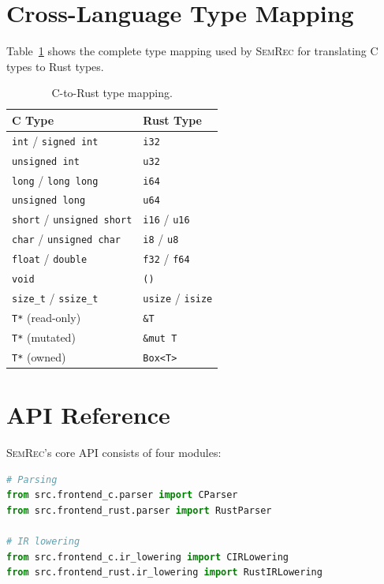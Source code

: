 \documentclass[11pt,a4paper]{article}
\begin{document}
\begin{appendices}
\section{Cross-Language Type Mapping}\label{app:typemap}

Table~\ref{tab:typemap} shows the complete type mapping used by
\textsc{SemRec} for translating C types to Rust types.

\begin{table}[h]
\centering
\small
\caption{C-to-Rust type mapping.}
\label{tab:typemap}
\begin{tabular}{@{}ll@{}}
\toprule
C Type & Rust Type \\
\midrule
\texttt{int} / \texttt{signed int} & \texttt{i32} \\
\texttt{unsigned int} & \texttt{u32} \\
\texttt{long} / \texttt{long long} & \texttt{i64} \\
\texttt{unsigned long} & \texttt{u64} \\
\texttt{short} / \texttt{unsigned short} & \texttt{i16} / \texttt{u16} \\
\texttt{char} / \texttt{unsigned char} & \texttt{i8} / \texttt{u8} \\
\texttt{float} / \texttt{double} & \texttt{f32} / \texttt{f64} \\
\texttt{void} & \texttt{()} \\
\texttt{size\_t} / \texttt{ssize\_t} & \texttt{usize} / \texttt{isize} \\
\texttt{T*} (read-only) & \texttt{\&T} \\
\texttt{T*} (mutated) & \texttt{\&mut T} \\
\texttt{T*} (owned) & \texttt{Box<T>} \\
\bottomrule
\end{tabular}
\end{table}


\section{API Reference}\label{app:api}

\textsc{SemRec}'s core API consists of four modules:

\begin{lstlisting}[language=Python,escapechar=|]
# Parsing
from src.frontend_c.parser import CParser
from src.frontend_rust.parser import RustParser

# IR lowering
from src.frontend_c.ir_lowering import CIRLowering
from src.frontend_rust.ir_lowering import RustIRLowering


\end{lstlisting}
\end{appendices}
\end{document}
